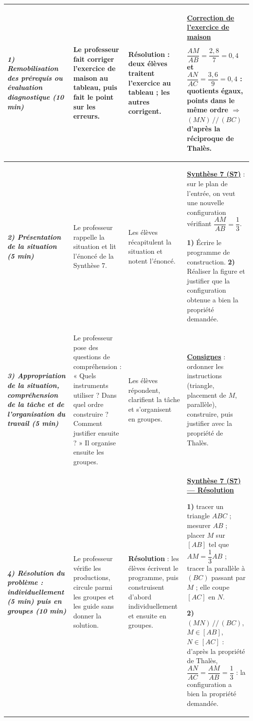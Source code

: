 \documentclass[10pt]{article}
\newcommand{\titreR}[1]{\underline{\textcolor{rougetitre}{\bfseries #1}}}
\newcommand{\seance}[1]{\fcolorbox{bleuseance}{bleufond}{\textcolor{bleuseance}{\bfseries #1}}}
\newcommand{\moment}[1]{\textbf{\itshape #1}}
\begin{document}
\begin{longtable}{|p{2.35cm}|p{5.35cm}|p{4.55cm}|p{13.85cm}|}
\hline
\seance{SEANCE 7} \newline \moment{1) Remobilisation des prérequis ou évaluation diagnostique (10 min)} &
Le professeur fait corriger l'exercice de maison au tableau, puis fait le point sur les erreurs. &
\textbf{Résolution} : deux élèves traitent l'exercice au tableau ; les autres corrigent. &
\titreR{Correction de l'exercice de maison} \par
$\dfrac{AM}{AB}=\dfrac{2{,}8}{7}=0{,}4$ et $\dfrac{AN}{AC}=\dfrac{3{,}6}{9}=0{,}4$ :
quotients égaux, points dans le même ordre $\Rightarrow$ $(MN)\,//\,(BC)$ d'après la
réciproque de Thalès. \\ \hline

\moment{2) Présentation de la situation (5 min)} &
Le professeur rappelle la situation  et lit l'énoncé de la Synthèse 7. &
Les élèves récapitulent la situation et notent l'énoncé. &
\titreR{Synthèse 7 (S7)} : sur le plan de l'entrée, on veut une nouvelle
configuration vérifiant $\dfrac{AM}{AB}=\dfrac{1}{3}$. \par
\textbf{1)} Écrire le programme de construction. \textbf{2)} Réaliser la figure et
justifier que la configuration obtenue a bien la propriété demandée. \\ \hline

\moment{3) Appropriation de la situation, compréhension de la tâche et de
l'organisation du travail (5 min)} &
Le professeur pose des questions de compréhension : « Quels instruments utiliser ? Dans quel ordre construire ? Comment justifier ensuite ? » Il organise ensuite les groupes. &
Les élèves répondent, clarifient la tâche et s'organisent en groupes. &
\titreR{Consignes} : ordonner les instructions (triangle, placement de $M$,
parallèle), construire, puis justifier avec la propriété de Thalès. \\ \hline

\moment{4) Résolution du problème : individuellement (5 min) puis en groupes (10 min)} &
Le professeur vérifie les productions, circule parmi les groupes et les guide sans donner la solution. &
\textbf{Résolution} : les élèves écrivent le programme, puis construisent d'abord individuellement et ensuite en groupes. &
\titreR{Synthèse 7 (S7) — Résolution} \par
\textbf{1)} tracer un triangle $ABC$ ; mesurer $AB$ ; placer $M$ sur $[AB]$ tel que
$AM=\dfrac{1}{3}AB$ ; tracer la parallèle à $(BC)$ passant par $M$ ; elle coupe
$[AC]$ en $N$. \par
\textbf{2)} $(MN)\,//\,(BC)$, $M\in[AB]$, $N\in[AC]$ : d'après la propriété de
Thalès, $\dfrac{AN}{AC}=\dfrac{AM}{AB}=\dfrac{1}{3}$ : la configuration a bien la
propriété demandée. \\ \hline


\end{longtable}
\end{document}
